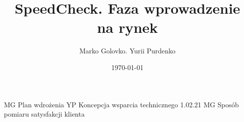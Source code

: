 \documentclass[12pt]{article}
\title{SpeedCheck. Faza wprowadzenie na rynek}
\author{Marko Golovko. Yurii Purdenko}
\date{\today}
\begin{document}
\begin{titlepage}
\maketitle
\end{titlepage}

\renewcommand{\vhhistoryname}{Historia zmian}
\newcommand{\MG}{Marko Golovko}
\begin{versionhistory}
  \renewcommand{\vhhistoryname}{Histria zmian}
  \renewcommand{\vhversionname}{Numer wersji}  
  \renewcommand{\vhdatename}{Data} 
  \renewcommand{\vhauthorname}{Autor} 
  \renewcommand{\vhchangename}{Opis}
   {MG} {Plan wdrożenia}
   {YP} {Koncepcja wsparcia technicznego}
    {1.02.21} {MG} {Sposób pomiaru satysfakcji klienta}
 \end{versionhistory}

\tableofcontents
\end{document}
